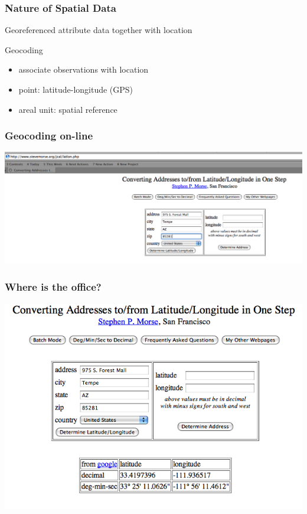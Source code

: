 \documentclass[nototal,handout]{beamer}
\begin{document}
\begin{frame}
	\frametitle{Nature of Spatial Data}
 
\begin{block}{Georeferenced}
  attribute data together with location
 \end{block} 
\begin{block}{Geocoding}
 \begin{itemize}
 \item  associate observations with location
 \item  point: latitude-longitude (GPS)
 \item  areal unit: spatial reference
 \end{itemize}
 \end{block} \end{frame} 

\begin{frame}
	\frametitle{Geocoding on-line}
    \begin{center}
      \includegraphics[width=.65\linewidth]{geocode1.png}
    \end{center}
 \end{frame} 

\begin{frame}
	\frametitle{Where is the office?}
    \begin{center}
      \includegraphics[width=.65\linewidth]{geocode2.png}
    \end{center}
 \end{frame} 
\end{document}
